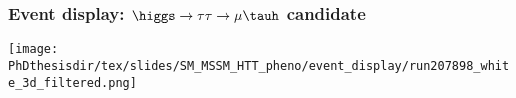 %
%

\begin{frame}
\frametitle{Event display: $\higgs\to\tau\tau\to\mu\tauh$ candidate}

\vfill

\begin{center}
\texttt{[image: \\PhDthesisdir/tex/slides/SM\_MSSM\_HTT\_pheno/event\_display/run207898\_white\_3d\_filtered.png]}
\end{center}

\vfill
\end{frame}

